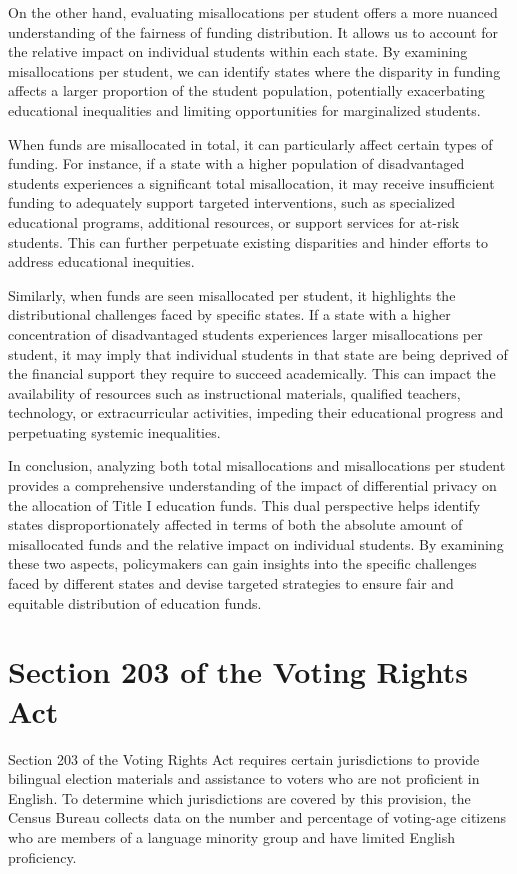 \documentclass[9pt,twocolumn,twoside,lineno]{pnas-new}
\begin{document}
On the other hand, evaluating misallocations per student offers a more nuanced understanding of the fairness of funding distribution. It allows us to account for the relative impact on individual students within each state. By examining misallocations per student, we can identify states where the disparity in funding affects a larger proportion of the student population, potentially exacerbating educational inequalities and limiting opportunities for marginalized students.

When funds are misallocated in total, it can particularly affect certain types of funding. For instance, if a state with a higher population of disadvantaged students experiences a significant total misallocation, it may receive insufficient funding to adequately support targeted interventions, such as specialized educational programs, additional resources, or support services for at-risk students. This can further perpetuate existing disparities and hinder efforts to address educational inequities.

Similarly, when funds are seen misallocated per student, it highlights the distributional challenges faced by specific states. If a state with a higher concentration of disadvantaged students experiences larger misallocations per student, it may imply that individual students in that state are being deprived of the financial support they require to succeed academically. This can impact the availability of resources such as instructional materials, qualified teachers, technology, or extracurricular activities, impeding their educational progress and perpetuating systemic inequalities.

In conclusion, analyzing both total misallocations and misallocations per student provides a comprehensive understanding of the impact of differential privacy on the allocation of Title I education funds. This dual perspective helps identify states disproportionately affected in terms of both the absolute amount of misallocated funds and the relative impact on individual students. By examining these two aspects, policymakers can gain insights into the specific challenges faced by different states and devise targeted strategies to ensure fair and equitable distribution of education funds.

\section*{Section 203 of the Voting Rights Act}
Section 203 of the Voting Rights Act requires certain jurisdictions to provide bilingual election materials and assistance to voters who are not proficient in English. To determine which jurisdictions are covered by this provision, the Census Bureau collects data on the number and percentage of voting-age citizens who are members of a language minority group and have limited English proficiency.
\end{document}

